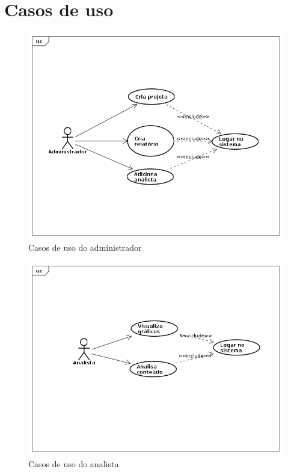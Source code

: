 \chapter{Casos de uso}

\begin{figure}[hb]
    \begin{center}
        \includegraphics[scale=0.5]{img/caso-uso-administrador.png}
        \caption{Casos de uso do administrador}
        \label{fig:caso-uso-administrador}
    \end{center}
\end{figure}

\begin{figure}[hb]
    \begin{center}
        \includegraphics[scale=0.5]{img/caso-uso-analista.png}
        \caption{Casos de uso do analista}
        \label{fig:caso-uso-analista}
    \end{center}
\end{figure}

